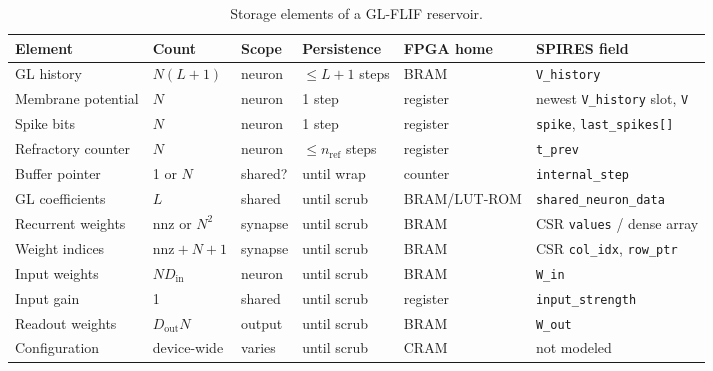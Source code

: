 \documentclass[11pt,a4paper]{article}
\begin{document}
\begin{table}[h]
\centering
\footnotesize
\begin{tabularx}{\textwidth}{@{}lllll>{\raggedright\arraybackslash}X@{}}
\toprule
Element & Count & Scope & Persistence & FPGA home & SPIRES field \\
\midrule
GL history & $N(L+1)$ & neuron & $\le L+1$ steps & BRAM & \texttt{V\_history} \\
Membrane potential & $N$ & neuron & 1 step & register & newest \texttt{V\_history} slot, \texttt{V} \\
Spike bits & $N$ & neuron & 1 step & register & \texttt{spike}, \texttt{last\_spikes[]} \\
Refractory counter & $N$ & neuron & $\le n_{\mathrm{ref}}$ steps & register & \texttt{t\_prev} \\
Buffer pointer & 1 or $N$ & shared? & until wrap & counter & \texttt{internal\_step} \\
GL coefficients & $L$ & shared & until scrub & BRAM/LUT-ROM & \texttt{shared\_neuron\_data} \\
Recurrent weights & $\mathrm{nnz}$ or $N^2$ & synapse & until scrub & BRAM & CSR \texttt{values} / dense array \\
Weight indices & $\mathrm{nnz} + N + 1$ & synapse & until scrub & BRAM & CSR \texttt{col\_idx}, \texttt{row\_ptr} \\
Input weights & $N D_{\mathrm{in}}$ & neuron & until scrub & BRAM & \texttt{W\_in} \\
Input gain & 1 & shared & until scrub & register & \texttt{input\_strength} \\
Readout weights & $D_{\mathrm{out}} N$ & output & until scrub & BRAM & \texttt{W\_out} \\
Configuration & device-wide & varies & until scrub & CRAM & not modeled \\
\bottomrule
\end{tabularx}
\caption{Storage elements of a GL-FLIF reservoir.}
\label{tab:inventory}
\end{table}
\end{document}
